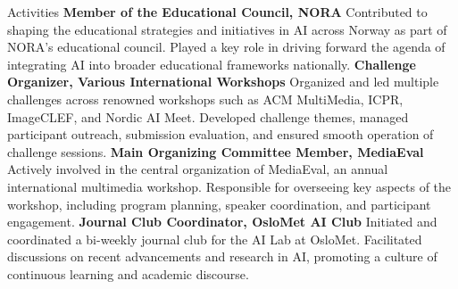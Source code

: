 \begin{rubric}{Activities}
\entry*[2023 -- present]%
\textbf{Member of the Educational Council, NORA} Contributed to shaping the educational strategies and initiatives in AI across Norway as part of NORA's educational council. Played a key role in driving forward the agenda of integrating AI into broader educational frameworks nationally.
% 
\entry*[2018 -- present]%
\textbf{Challenge Organizer, Various International Workshops} Organized and led multiple challenges across renowned workshops such as ACM MultiMedia, ICPR, ImageCLEF, and Nordic AI Meet. Developed challenge themes, managed participant outreach, submission evaluation, and ensured smooth operation of challenge sessions.
%
\entry*[2018 -- present]%
\textbf{Main Organizing Committee Member, MediaEval} Actively involved in the central organization of MediaEval, an annual international multimedia workshop. Responsible for overseeing key aspects of the workshop, including program planning, speaker coordination, and participant engagement.
% 
\entry*[2019 -- 2020]%
\textbf{Journal Club Coordinator, OsloMet AI Club} Initiated and coordinated a bi-weekly journal club for the AI Lab at OsloMet. Facilitated discussions on recent advancements and research in AI, promoting a culture of continuous learning and academic discourse.
\end{rubric}